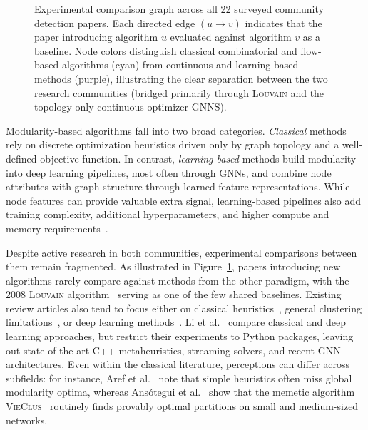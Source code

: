 \documentclass[11pt,a4paper]{article}
\providecommand{\Description}[1]{}
\begin{document}
\begin{figure}[tbp]

    \caption{Experimental comparison graph across all 22 surveyed community detection papers. Each directed edge $(u \to v)$ indicates that the paper introducing algorithm $u$ evaluated against algorithm $v$ as a baseline. Node colors distinguish classical combinatorial and flow-based algorithms (cyan) from continuous and learning-based methods (purple), illustrating the clear separation between the two research communities (bridged primarily through \textsc{Louvain} and the topology-only continuous optimizer \textsc{GNNS}).}
    \Description{Directed graph showing baseline comparisons across 22 community detection papers, highlighting the separation between classical methods and learning-based methods.}
    \label{fig:comparisons}
\end{figure}

Modularity-based algorithms fall into two broad categories. \emph{Classical} methods rely on discrete optimization heuristics driven only by graph topology and a well-defined objective function. In contrast, \emph{learning-based} methods build modularity into deep learning pipelines, most often through GNNs, and combine node attributes with graph structure through learned feature representations. While node features can provide valuable extra signal, learning-based pipelines also add training complexity, additional hyperparameters, and higher compute and memory requirements~\cite{neuromap2024,Wani2024}.

Despite active research in both communities, experimental comparisons between them remain fragmented. As illustrated in Figure~\ref{fig:comparisons}, papers introducing new algorithms rarely compare against methods from the other paradigm, with the 2008 \textsc{Louvain} algorithm~\cite{louvain2008} serving as one of the few shared baselines. Existing review articles also tend to focus either on classical heuristics~\cite{survey2023}, general clustering limitations~\cite{Wani2024}, or deep learning methods~\cite{Liu2020,Jin2023,Messias2025}. Li et al.~\cite{Li2024} compare classical and deep learning approaches, but restrict their experiments to Python packages, leaving out state-of-the-art C++ metaheuristics, streaming solvers, and recent GNN architectures. Even within the classical literature, perceptions can differ across subfields: for instance, Aref et al.~\cite{survey2023} note that simple heuristics often miss global modularity optima, whereas Ans{\'o}tegui et al.~\cite{maxsat2025} show that the memetic algorithm \textsc{VieClus}~\cite{vieclus2018} routinely finds provably optimal partitions on small and medium-sized networks.
\end{document}
